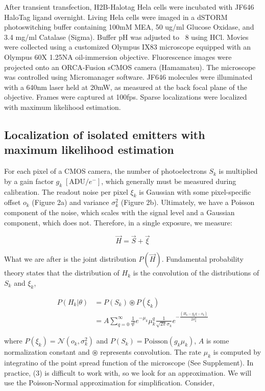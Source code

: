 \documentclass{ucetd}
\begin{document}
After transient transfection, H2B-Halotag Hela cells were incubated with JF646 HaloTag ligand overnight. Living Hela cells were imaged in a dSTORM photoswitching buffer containing 100mM MEA, 50 ug/ml Glucose Oxidase, and 3.4 mg/ml Catalase (Sigma). Buffer pH was adjusted to ~8 using HCl. Movies were collected using a customized Olympus IX83 microscope equipped with an Olympus 60X 1.25NA oil-immersion objective. Fluorescence images were projected onto an ORCA-Fusion sCMOS camera (Hamamatsu). The microscope was controlled using Micromanager software. JF646 molecules were illuminated with a 640nm laser held at 20mW, as measured at the back focal plane of the objective.  Frames were captured at 100fps. Sparse localizations were localized with maximum likelihood estimation. 

\subsection{Localization of isolated emitters with maximum likelihood estimation}

For each pixel of a CMOS camera, the number of photoelectrons $S_{k}$ is  multiplied by a gain factor $g_{k} \;[\mathrm{ADU}/e^{-}]$, which generally must be measured during calibration. The readout noise per pixel $\xi_{k}$ is Gaussian with some pixel-specific offset $o_{k}$ (Figure 2a) and variance $\sigma_{k}^{2}$ (Figure 2b). Ultimately, we have a Poisson component of the noise, which scales with the signal level and a Gaussian component, which does not. Therefore, in a single exposure, we measure: 

\begin{equation}
\vec{H} = \vec{S} + \vec{\xi}
\end{equation}

What we are after is the joint distribution $P(\vec{H})$. Fundamental probability theory states that the distribution of $H_{k}$ is the convolution of the distributions of $S_{k}$ and $\xi_{k}$,

\begin{align}
P(H_{k}|\theta) &= P(S_{k})\circledast P(\xi_{k})\\
&= A\sum_{q=0}^{\infty} \frac{1}{q!}e^{-\mu_{k}}\mu_{k}^{q}\frac{1}{\sqrt{2\pi}\sigma_{k}}e^{-\frac{(H_{k}-g_{k}q-o_{k})}{2\sigma_{k}^{2}}}
\end{align}

where $P(\xi_{k}) = \mathcal{N}(o_{k},\sigma_{k}^{2})$ and $P(S_{k}) = \mathrm{Poisson}(g_{k}\mu_{k})$,  $A$ is some normalization constant and $\circledast$ represents convolution. The rate $\mu_{k}$ is computed by integratino of the point spread function of the microscope (See Supplement). In practice, (3) is difficult to work with, so we look for an approximation. We will use the Poisson-Normal approximation for simplification. Consider,
\end{document}
